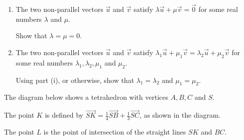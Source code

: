 \begin{problem}
\begin{enumerate}[label=(\roman*)]
    \item The two non-parallel vectors $\vec{u}$ and $\vec{v}$ satisfy $\lambda \vec{u} + \mu \vec{v} = \vec{0}$ for some real numbers $\lambda$ and $\mu$.
    
    Show that $\lambda = \mu = 0$.

    \item The two non-parallel vectors $\vec{u}$ and $\vec{v}$ satisfy $\lambda_1 \vec{u} + \mu_1 \vec{v} = \lambda_2 \vec{u} + \mu_2 \vec{v}$ for some real numbers $\lambda_1, \lambda_2, \mu_1$ and $\mu_2$.
    
    Using part (i), or otherwise, show that $\lambda_1 = \lambda_2$ and $\mu_1 = \mu_2$.
\end{enumerate}


\vspace{0.3cm}

\noindent The diagram below shows a tetrahedron with vertices $A, B, C$ and $S$.

\noindent The point $K$ is defined by $\vec{SK} = \frac{1}{4}\vec{SB} + \frac{1}{3}\vec{SC}$, as shown in the diagram.

\noindent The point $L$ is the point of intersection of the straight lines $SK$ and $BC$.

\vspace{0.3cm}

\begin{center}
\end{center}
\end{problem}
